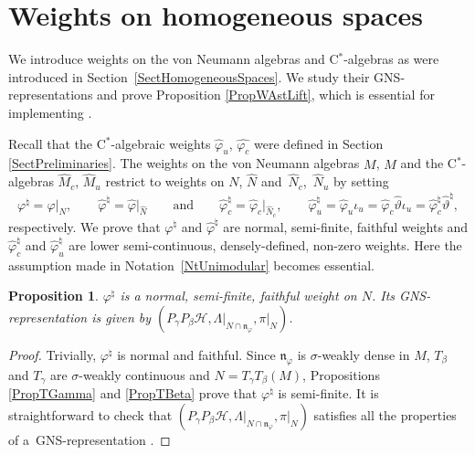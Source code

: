 \documentclass[11pt]{article}
\numberwithin{equation}{section}
\newtheorem{prop}[thm]{Proposition}
\theoremstyle{definition}
\newcommand{\cHil}{\mathcal{H}}
\newcommand{\nphi}{\mathfrak{n}_\varphi}
\begin{document}
\section{Weights on homogeneous spaces}\label{SectWeights}

We introduce weights on the von Neumann algebras and C$^\ast$-algebras as were introduced in Section~\ref{SectHomogeneousSpaces}. We study their GNS-representations and prove Proposition \ref{PropWAstLift}, which is essential for implementing \cite[Theorem~3.4.5]{Des}.



Recall that the C$^\ast$-algebraic weights $\hat{\varphi}_u$, $\hat{\varphi_c}$ were def\/ined in  Section \ref{SectPreliminaries}.
The weights on the von Neumann algebras $M$, $\hat{M}$ and the C$^\ast$-algebras $\hat{M}_c$, $\hat{M}_u$ restrict to weights on $N$, $\hat{N}$ and~$\hat{N}_c$,~$\hat{N}_u$ by setting
\[
\varphi^\natural = \varphi \vert _N, \qquad \hat{\varphi}^\natural = \hat{\varphi} \vert_{\hat{N}} \qquad \textrm{and} \qquad \hat{\varphi}_c^\natural = \hat{\varphi}_c\vert_{\hat{N}_c},\qquad \hat{\varphi}_u^\natural = \hat{\varphi}_u \iota_u = \hat{\varphi}_c \hat{\vartheta} \iota_u = \hat{\varphi}_c^\natural \hat{\vartheta}^\natural,
\]
 respectively. We prove that $\varphi^\natural$ and $\hat{\varphi}^\natural$ are normal, semi-f\/inite, faithful weights  and $\hat{\varphi}_c^\natural$ and $\hat{\varphi}_u^\natural$ are lower semi-continuous, densely-def\/ined, non-zero weights. Here the assumption made in Notation~\ref{NtUnimodular} becomes essential.

\begin{prop}\label{PropNormalWeightVNA}
$\varphi^\natural$ is a normal, semi-finite, faithful weight on $N$. Its GNS-representation is given by $(P_\gamma P_\beta \cHil, \Lambda \vert_{N \cap \nphi}, \pi\vert_N)$.
\end{prop}
\begin{proof}
Trivially, $\varphi^\natural$ is normal and faithful. Since $\nphi$ is $\sigma$-weakly dense in $M$, $T_\beta$ and $T_\gamma$ are $\sigma$-weakly continuous and $N = T_\gamma T_\beta(M)$, Propositions \ref{PropTGamma} and \ref{PropTBeta} prove that $\varphi^\natural$ is semi-f\/inite. It is straightforward to check that $(P_\gamma P_\beta \cHil, \Lambda \vert_{N \cap \nphi}, \pi\vert_N)$ satisf\/ies all the properties of a~GNS-representation \cite[Section VII.1]{TakII}.
\end{proof}
\end{document}
